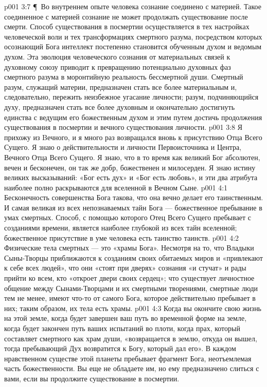 \vs p001 3:7 \P\ Во внутреннем опыте человека сознание соединено с материей. Такое соединенное с материей сознание не может продолжать существование после смерти. Способ существования в посмертии осуществляется в тех настройках человеческой воли и тех трансформациях смертного разума, посредством которых осознающий Бога интеллект постепенно становится обученным духом и ведомым духом. Эта эволюция человеческого сознания от материальных связей к духовному союзу приводит к превращению потенциально духовных фаз смертного разума в моронтийную реальность бессмертной души. Смертный разум, служащий материи, предназначен стать все более материальным и, следовательно, пережить неизбежное угасание личности; разум, подчиняющийся духу, предназначен стать все более духовным и окончательно достигнуть единства с ведущим его божественным духом и этим путем достичь продолжения существования в посмертии и вечного существования личности.
\vs p001 3:8 Я прихожу из Bечного, и я много раз возвращался вновь к присутствию Отца Всего Сущего. Я знаю о действительности и личности Первоисточника и Центра, Вечного Отца Всего Сущего. Я знаю, что в то время как великий Бог абсолютен, вечен и бесконечен, он так же добр, божественен и милосерден. Я знаю истину великих высказываний: «Бог есть дух» и «Бог есть любовь», и эти два атрибута наиболее полно раскрываются для вселенной в Вечном Сыне.
\vs p001 4:1 Бесконечность совершенства Бога такова, что она вечно делает его таинственным. И самая великая из всех непознаваемых тайн Бога --- божественное пребывание в умах смертных. Способ, с помощью которого Отец Всего Сущего пребывает с созданиями времени, является наиболее глубокой из всех тайн вселенной; божественное присутствие в уме человека есть таинство таинств.
\vs p001 4:2 Физические тела смертных --- это «храмы Бога». Несмотря на то, что Владыки Сыны\hyp{}Творцы приближаются к созданиям своих обитаемых миров и «привлекают к себе всех людей», что они «стоят при дверях» сознания «и стучат» и рады прийти ко всем, кто «откроет двери своих сердец»; что существует личностное общение между Сынами\hyp{}Творцами и их смертными творениями, смертные люди тем не менее, имеют что\hyp{}то от самого Бога, которое действительно пребывает в них; таким образом, их тела есть храмы.
\vs p001 4:3 Когда вы окончите свою жизнь на этой земле, когда будет завершен ваш путь во временной форме на земле, когда будет закончен путь ваших испытаний во плоти, когда прах, который составляет смертного как храм души, «возвращается в землю, откуда он вышел, тогда пребывающий Дух возвратится к Богу, который дал его». В каждом нравственном существе этой планеты пребывает фрагмент Бога, неотъемлемая часть божественности. Вы еще не обладаете им, но ему предназначено слиться с вами, если вы продолжите существование в посмертии.
